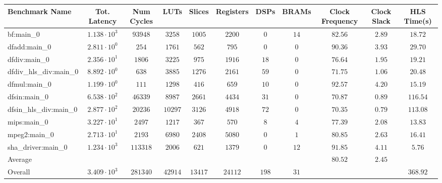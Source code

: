 \begin{tabular}{|l|c|c|c|c|c|c|c|c|c|c|}
\hline
Benchmark Name          & Tot. Latency           & Num Cycles & LUTs      & Slices    & Registers & DSPs    & BRAMs  & Clock Frequency & Clock Slack & HLS Time(s) \\
\hline
bf:main\_0              & $ 1.138 \cdot 10^{3} $ & $ 93948  $ & $ 3258  $ & $ 1005  $ & $ 2200  $ & $ 0   $ & $ 14 $ & $ 82.56       $ & $ 2.89    $ & $ 18.72   $ \\
dfadd:main\_0           & $ 2.811 \cdot 10^{0} $ & $ 254    $ & $ 1761  $ & $ 562   $ & $ 795   $ & $ 0   $ & $ 0  $ & $ 90.36       $ & $ 3.93    $ & $ 29.70   $ \\
dfdiv:main\_0           & $ 2.356 \cdot 10^{1} $ & $ 1806   $ & $ 3225  $ & $ 975   $ & $ 1916  $ & $ 18  $ & $ 0  $ & $ 76.64       $ & $ 1.95    $ & $ 19.21   $ \\
dfdiv\_hls\_div:main\_0 & $ 8.892 \cdot 10^{0} $ & $ 638    $ & $ 3885  $ & $ 1276  $ & $ 2161  $ & $ 59  $ & $ 0  $ & $ 71.75       $ & $ 1.06    $ & $ 20.48   $ \\
dfmul:main\_0           & $ 1.199 \cdot 10^{0} $ & $ 111    $ & $ 1298  $ & $ 416   $ & $ 659   $ & $ 10  $ & $ 0  $ & $ 92.57       $ & $ 4.20    $ & $ 15.19   $ \\
dfsin:main\_0           & $ 6.538 \cdot 10^{2} $ & $ 46339  $ & $ 8987  $ & $ 2661  $ & $ 4434  $ & $ 31  $ & $ 0  $ & $ 70.87       $ & $ 0.89    $ & $ 116.54  $ \\
dfsin\_hls\_div:main\_0 & $ 2.877 \cdot 10^{2} $ & $ 20236  $ & $ 10297 $ & $ 3126  $ & $ 4918  $ & $ 72  $ & $ 0  $ & $ 70.35       $ & $ 0.79    $ & $ 113.08  $ \\
mips:main\_0            & $ 3.227 \cdot 10^{1} $ & $ 2497   $ & $ 1217  $ & $ 367   $ & $ 570   $ & $ 8   $ & $ 4  $ & $ 77.39       $ & $ 2.08    $ & $ 13.83   $ \\
mpeg2:main\_0           & $ 2.713 \cdot 10^{1} $ & $ 2193   $ & $ 6980  $ & $ 2408  $ & $ 5080  $ & $ 0   $ & $ 1  $ & $ 80.85       $ & $ 2.63    $ & $ 16.41   $ \\
sha\_driver:main\_0     & $ 1.234 \cdot 10^{3} $ & $ 113318 $ & $ 2006  $ & $ 621   $ & $ 1379  $ & $ 0   $ & $ 12 $ & $ 91.85       $ & $ 4.11    $ & $ 5.76    $ \\
\hline
Average                 & $                    $ & $        $ & $       $ & $       $ & $       $ & $     $ & $    $ & $ 80.52       $ & $ 2.45    $ & $         $ \\
\hline
Overall                 & $ 3.409 \cdot 10^{3} $ & $ 281340 $ & $ 42914 $ & $ 13417 $ & $ 24112 $ & $ 198 $ & $ 31 $ & $             $ & $         $ & $ 368.92  $ \\
\hline
\end{tabular}
